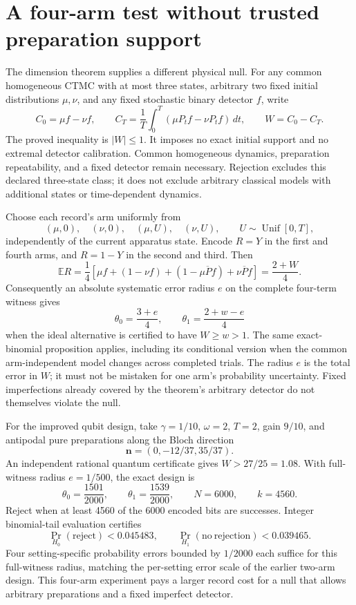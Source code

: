 \section{A four-arm test without trusted preparation support}
The dimension theorem supplies a different physical null. For any common
homogeneous CTMC with at most three states, arbitrary two fixed initial
distributions $\mu,\nu$, and any fixed stochastic binary detector $f$,
write
\[
 C_0=\mu f-\nu f,\qquad
 C_T=\frac1T\int_0^T(\mu P_t f-\nu P_t f)\,dt,
 \qquad W=C_0-C_T.
\]
The proved inequality is $|W|\leq1$. It imposes no exact initial support
and no extremal detector calibration. Common homogeneous dynamics,
preparation repeatability, and a fixed detector remain necessary. Rejection
excludes this declared three-state class; it does not exclude arbitrary
classical models with additional states or time-dependent dynamics.

Choose each record's arm uniformly from
\[
  (\mu,0),\quad(\nu,0),\quad(\mu,U),\quad(\nu,U),
  \qquad U\sim\operatorname{Unif}[0,T],
\]
independently of the current apparatus state. Encode $R=Y$ in the first
and fourth arms, and $R=1-Y$ in the second and third. Then
\[
 \mathbb E R=\frac14
 \left[\mu f+(1-\nu f)+(1-\overline{\mu P f})
                   +\overline{\nu P f}\right]
 =\frac{2+W}{4}.
\]
Consequently an absolute systematic error radius $e$ on the complete
four-term witness gives
\[
 \theta_0=\frac{3+e}{4},\qquad
 \theta_1=\frac{2+w-e}{4}
\]
when the ideal alternative is certified to have $W\geq w>1$.
The same exact-binomial proposition applies, including its conditional
version when the common arm-independent model changes across completed
trials. The radius $e$ is the total error in $W$; it must not be mistaken
for one arm's probability uncertainty. Fixed imperfections already covered
by the theorem's arbitrary detector do not themselves violate the null.

For the improved qubit design, take $\gamma=1/10$, $\omega=2$, $T=2$,
gain $9/10$, and antipodal pure preparations along the Bloch direction
\[
 \boldsymbol n=(0,-12/37,35/37).
\]
An independent rational quantum certificate gives $W>27/25=1.08$.
With full-witness radius $e=1/500$, the exact design is
\[
 \theta_0=\frac{1501}{2000},\qquad
 \theta_1=\frac{1539}{2000},\qquad
 N=6000,\qquad k=4560.
\]
Reject when at least 4560 of the 6000 encoded bits are successes. Integer
binomial-tail evaluation certifies
\[
 \Pr_{H_0}(\mathrm{reject})<0.045483,\qquad
 \Pr_{H_1}(\mathrm{no\ rejection})<0.039465.
\]
Four setting-specific probability errors bounded by $1/2000$ each suffice
for this full-witness radius, matching the per-setting error scale of the
earlier two-arm design. This four-arm experiment pays a larger record
cost for a null that allows arbitrary preparations and a fixed imperfect
detector.

